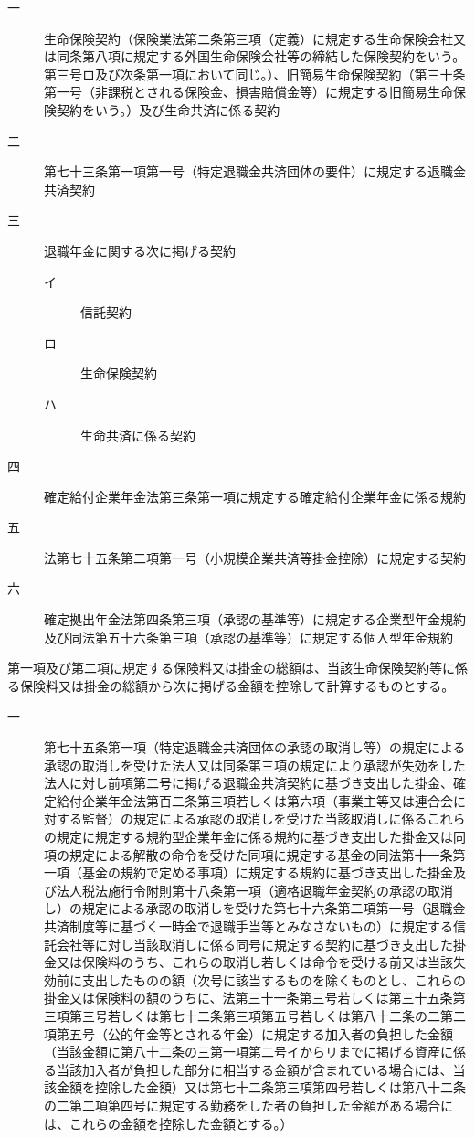 \documentclass[twocolumn,a4j,10pt]{ltjtarticle}
\begin{document}
\begin{description}
\begin{description}
\item[一]生命保険契約（保険業法第二条第三項（定義）に規定する生命保険会社又は同条第八項に規定する外国生命保険会社等の締結した保険契約をいう。第三号ロ及び次条第一項において同じ。）、旧簡易生命保険契約（第三十条第一号（非課税とされる保険金、損害賠償金等）に規定する旧簡易生命保険契約をいう。）及び生命共済に係る契約
\item[二]第七十三条第一項第一号（特定退職金共済団体の要件）に規定する退職金共済契約
\item[三]退職年金に関する次に掲げる契約
\begin{description}
\item[イ]信託契約
\item[ロ]生命保険契約
\item[ハ]生命共済に係る契約
\end{description}
\item[四]確定給付企業年金法第三条第一項に規定する確定給付企業年金に係る規約
\item[五]法第七十五条第二項第一号（小規模企業共済等掛金控除）に規定する契約
\item[六]確定拠出年金法第四条第三項（承認の基準等）に規定する企業型年金規約及び同法第五十六条第三項（承認の基準等）に規定する個人型年金規約
\end{description}
\item[\rensuji{4}]第一項及び第二項に規定する保険料又は掛金の総額は、当該生命保険契約等に係る保険料又は掛金の総額から次に掲げる金額を控除して計算するものとする。
\begin{description}
\item[一]第七十五条第一項（特定退職金共済団体の承認の取消し等）の規定による承認の取消しを受けた法人又は同条第三項の規定により承認が失効をした法人に対し前項第二号に掲げる退職金共済契約に基づき支出した掛金、確定給付企業年金法第百二条第三項若しくは第六項（事業主等又は連合会に対する監督）の規定による承認の取消しを受けた当該取消しに係るこれらの規定に規定する規約型企業年金に係る規約に基づき支出した掛金又は同項の規定による解散の命令を受けた同項に規定する基金の同法第十一条第一項（基金の規約で定める事項）に規定する規約に基づき支出した掛金及び法人税法施行令附則第十八条第一項（適格退職年金契約の承認の取消し）の規定による承認の取消しを受けた第七十六条第二項第一号（退職金共済制度等に基づく一時金で退職手当等とみなさないもの）に規定する信託会社等に対し当該取消しに係る同号に規定する契約に基づき支出した掛金又は保険料のうち、これらの取消し若しくは命令を受ける前又は当該失効前に支出したものの額（次号に該当するものを除くものとし、これらの掛金又は保険料の額のうちに、法第三十一条第三号若しくは第三十五条第三項第三号若しくは第七十二条第三項第五号若しくは第八十二条の二第二項第五号（公的年金等とされる年金）に規定する加入者の負担した金額（当該金額に第八十二条の三第一項第二号イからリまでに掲げる資産に係る当該加入者が負担した部分に相当する金額が含まれている場合には、当該金額を控除した金額）又は第七十二条第三項第四号若しくは第八十二条の二第二項第四号に規定する勤務をした者の負担した金額がある場合には、これらの金額を控除した金額とする。）

\end{description}
\end{description}
\end{document}
